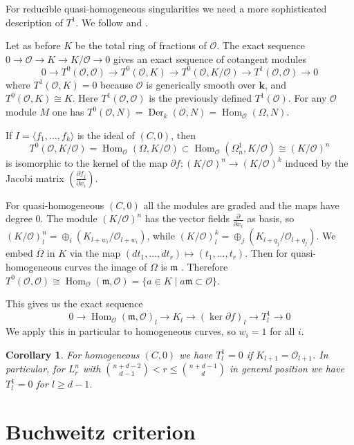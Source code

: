 \documentclass{amsart}
\newcommand {\m}{\mathfrak{m}}
\renewcommand{\k}{\mathbf{k}} %
\DeclareMathOperator{\Hom}{Hom}
\renewcommand{\ell}{l}
\newcommand{\mO}{\mathcal{O}}
\newtheorem{cor}[thm]{Corollary}
\theoremstyle{definition}
\theoremstyle{remark}
\begin{document}
For reducible quasi-homogeneous singularities we need a more sophisticated
description of $T^1$. We follow \cite{RV} and \cite{Gr0}.

Let as before $K$ be the total ring of fractions of $\mO$.
The exact sequence $0\to \mO \to K \to K/\mO \to 0 $ gives an exact sequence of
cotangent modules
\[
0 \to T^0(\mO,\mO)  \to T^0(\mO,K)\to T^0(\mO,K/\mO)
\to T^1(\mO,\mO)  \to 0
\]
where $T^1(\mO,K)=0$ because $\mO$ is generically smooth over $\k$, and
$T^0(\mO,K)\cong K$.  Here $T^1(\mO,\mO)$ is the previously defined $T^1(\mO)$.
For any $\mO$ module $M$ one has $T^0(\mO,N)=\operatorname{Der}_k(\mO,N) = 
\Hom_{\mO}(\Omega,N)$. 

If $I=\langle f_1,\dots,f_k\rangle$ is  the ideal of $(C,0)$, then 
\[
T^0(\mO,K/\mO) =\Hom_{\mO}(\Omega,K/\mO)\subset 
\Hom_{\mO}(\Omega^1_n,K/\mO)\cong (K/\mO)^n
\]
  is isomorphic
to the kernel of the map ${\partial f}\colon(K/\mO)^n\to (K/\mO)^k$ 
induced by the Jacobi matrix
$\left(\frac{\partial f_j}{\partial x_i}\right)$.


For quasi-homogeneous $(C,0)$ all the modules are graded and the maps have degree 0.
The module $(K/\mO)^n$ has the vector fields $\frac{\partial }{\partial x_i}$ as basis,
so $(K/\mO)^n_{\ell} = \oplus_i  (K_{\ell+w_i} /\mO_{\ell+w_i} )$, while 
$(K/\mO)^k_{\ell} = \oplus_j  (K_{\ell+q_j} /\mO_{\ell+q_j} )$. We embed $\overline \Omega$ in $K$
via the map $(dt_1,\dots,dt_r)\mapsto(t_1,\dots,t_r)$.  Then for quasi-homogeneous curves the
image of $\Omega$ is $\m$ \cite[Lemma 2.2]{Gr}.
Therefore $T^0(\mO,\mO)\cong \Hom_\mO(\m,\mO)=\{a\in K\mid a\m\subset \mO\}$.

This gives us the exact sequence
\begin{equation}\label{eq:exact} 
 0 \to \Hom_\mO(\m,\mO)_{\ell} \to K_{\ell} \to (\ker{\partial f}) _{\ell}\to T^1_{\ell} \to 0
 \end{equation}
 We apply this in particular to homogeneous curves, so $w_i=1$ for all $i$.
 \begin{cor}\label{cor:Tplusnul}
 For homogeneous $(C,0)$ we have
 $T^1_{\ell}=0$ if $K_{\ell+1}=\mO_{\ell+1}$.
 In particular, for $L_r^n$ with  $\binom{n+d-2}{d-1} <r \leq \binom{n+d-1}{d}$ in general
  position we have $T^1_{\ell}=0$ for $\ell\geq d-1$.
 \end{cor}

\section{Buchweitz criterion}
\end{document}
